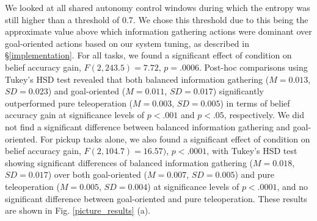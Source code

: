\documentclass[conference]{IEEEtran}
\begin{document}

We looked at all shared autonomy control windows during which the entropy was still higher than a threshold of 0.7. We chose this threshold due to this being the approximate value above which information gathering actions were dominant over goal-oriented actions based on our system tuning, as described in \S\ref{implementation}. For all tasks, we found a significant effect of condition on belief accuracy gain, $F(2, 243.5) = 7.72$, $p = .0006$. Post-hoc comparisons using Tukey's HSD test revealed that both balanced information gathering ($M = 0.013$, $SD = 0.023$) and goal-oriented ($M = 0.011$, $SD = 0.017$) significantly outperformed pure teleoperation ($M = 0.003$, $SD = 0.005$) in terms of belief accuracy gain at significance levels of $p < .001$ and $p < .05$, respectively. We did not find a significant difference between balanced information gathering and goal-oriented. For pickup tasks alone, we also found a significant effect of condition on belief accuracy gain, $F(2, 104.7) = 16.57)$, $p < .0001$, with Tukey's HSD test showing significant differences of balanced information gathering ($M = 0.018$, $SD = 0.017$) over both goal-oriented ($M = 0.007$, $SD = 0.005$) and pure teleoperation ($M = 0.005$, $SD = 0.004$) at significance levels of $p < .0001$,  and no significant difference between goal-oriented and pure teleoperation. These results are shown in Fig. \ref{picture_results} (a).
\end{document}
